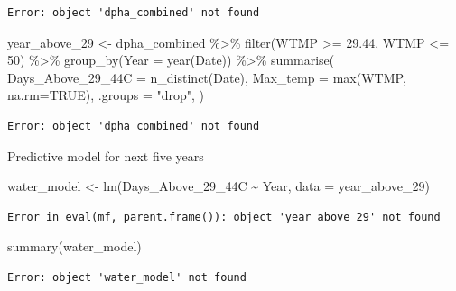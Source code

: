 \documentclass[
  letterpaper,
  DIV=11,
  numbers=noendperiod]{scrreprt}
\newenvironment{Shaded}{\begin{snugshade}}{\end{snugshade}}
\newcommand{\AttributeTok}[1]{\textcolor[rgb]{0.40,0.45,0.13}{#1}}
\newcommand{\ConstantTok}[1]{\textcolor[rgb]{0.56,0.35,0.01}{#1}}
\newcommand{\DecValTok}[1]{\textcolor[rgb]{0.68,0.00,0.00}{#1}}
\newcommand{\FloatTok}[1]{\textcolor[rgb]{0.68,0.00,0.00}{#1}}
\newcommand{\FunctionTok}[1]{\textcolor[rgb]{0.28,0.35,0.67}{#1}}
\newcommand{\NormalTok}[1]{\textcolor[rgb]{0.00,0.23,0.31}{#1}}
\newcommand{\OtherTok}[1]{\textcolor[rgb]{0.00,0.23,0.31}{#1}}
\newcommand{\SpecialCharTok}[1]{\textcolor[rgb]{0.37,0.37,0.37}{#1}}
\newcommand{\StringTok}[1]{\textcolor[rgb]{0.13,0.47,0.30}{#1}}
\begin{document}
\begin{verbatim}
Error: object 'dpha_combined' not found
\end{verbatim}

\begin{Shaded}
\begin{Highlighting}[]
\NormalTok{year\_above\_29 }\OtherTok{\textless{}{-}}\NormalTok{ dpha\_combined }\SpecialCharTok{\%\textgreater{}\%}
  \FunctionTok{filter}\NormalTok{(WTMP }\SpecialCharTok{\textgreater{}=} \FloatTok{29.44}\NormalTok{, WTMP }\SpecialCharTok{\textless{}=} \DecValTok{50}\NormalTok{) }\SpecialCharTok{\%\textgreater{}\%}
  \FunctionTok{group\_by}\NormalTok{(}\AttributeTok{Year =} \FunctionTok{year}\NormalTok{(Date)) }\SpecialCharTok{\%\textgreater{}\%}
  \FunctionTok{summarise}\NormalTok{(}
    \AttributeTok{Days\_Above\_29\_44C =} \FunctionTok{n\_distinct}\NormalTok{(Date), }
    \AttributeTok{Max\_temp =} \FunctionTok{max}\NormalTok{(WTMP, }\AttributeTok{na.rm=}\ConstantTok{TRUE}\NormalTok{),}
    \AttributeTok{.groups =} \StringTok{"drop"}\NormalTok{,}
\NormalTok{    )}
\end{Highlighting}
\end{Shaded}

\begin{verbatim}
Error: object 'dpha_combined' not found
\end{verbatim}

Predictive model for next five years

\begin{Shaded}
\begin{Highlighting}[]
\NormalTok{water\_model }\OtherTok{\textless{}{-}} \FunctionTok{lm}\NormalTok{(Days\_Above\_29\_44C }\SpecialCharTok{\textasciitilde{}}\NormalTok{ Year, }\AttributeTok{data =}\NormalTok{ year\_above\_29)}
\end{Highlighting}
\end{Shaded}

\begin{verbatim}
Error in eval(mf, parent.frame()): object 'year_above_29' not found
\end{verbatim}

\begin{Shaded}
\begin{Highlighting}[]
\FunctionTok{summary}\NormalTok{(water\_model)  }
\end{Highlighting}
\end{Shaded}

\begin{verbatim}
Error: object 'water_model' not found
\end{verbatim}
\end{document}

